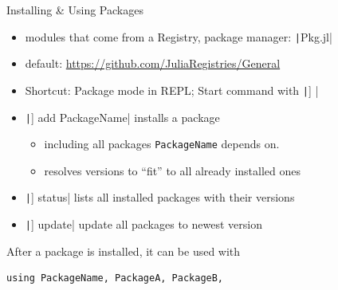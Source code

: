 \documentclass[aspectratio=169, 12pt]{beamer}
\begin{document}
    \begin{frame}[fragile]{Installing \& Using Packages}
        \begin{itemize}[<+->]
            \item modules that come from a \alert{Registry}, package manager: \texttt|Pkg.jl|
            \item default: \url{https://github.com/JuliaRegistries/General}
            \item Shortcut: \alert{Package mode} in REPL; Start command with \texttt|] |
            \item \texttt|] add PackageName| installs a package
            \begin{itemize}
                \item including all packages \texttt{PackageName} \alert{depends} on.
                \item resolves versions to “fit” to all already installed ones
            \end{itemize}
            \item \texttt|] status| lists all installed packages with their versions
            \item \texttt|] update| update all packages to newest version
        \end{itemize}
        \pause
        After a package is installed, it can be used with
        \begin{verbatim}
using PackageName, PackageA, PackageB,
        \end{verbatim}
    \end{frame}
\end{document}
